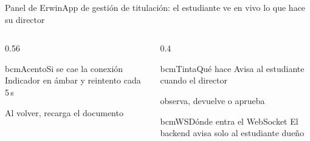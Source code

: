 \begin{frame}{Panel de Erwin}{App de gestión de titulación: el estudiante ve en vivo lo que hace su director}
  \begin{columns}[T]
    \begin{column}{0.56\textwidth}
      \begin{tarjeta}{bcmAcento}{Si se cae la conexión}
        \footnotesize Indicador en ámbar y reintento cada 5\,s\par
        Al volver, recarga el documento
      \end{tarjeta}
    \end{column}
    \begin{column}{0.4\textwidth}
      \begin{tarjeta}{bcmTinta}{Qué hace}
        \footnotesize Avisa al estudiante cuando el director\par
        observa, devuelve o aprueba
      \end{tarjeta}
      \begin{tarjeta}{bcmWS}{Dónde entra el WebSocket}
        \footnotesize El backend avisa solo al estudiante dueño
      \end{tarjeta}
    \end{column}
  \end{columns}
\end{frame}
